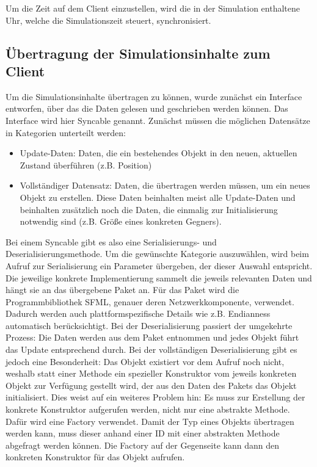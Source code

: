 Um die Zeit auf dem Client einzustellen, wird die in der Simulation enthaltene Uhr, welche die Simulationszeit steuert, synchronisiert.



\subsection{Übertragung der Simulationsinhalte zum Client}
\label{sec:syncable}
Um die Simulationsinhalte übertragen zu können, wurde zunächst ein Interface entworfen, über das die Daten gelesen und geschrieben werden können. Das Interface wird hier Syncable genannt.
Zunächst müssen die möglichen Datensätze in Kategorien unterteilt werden:
\begin{itemize}
\item Update-Daten: Daten, die ein bestehendes Objekt in den neuen, aktuellen Zustand überführen (z.B. Position)
\item Vollständiger Datensatz: Daten, die übertragen werden müssen, um ein neues Objekt zu erstellen. Diese Daten beinhalten meist alle Update-Daten und beinhalten zusätzlich noch die Daten, die einmalig zur Initialisierung notwendig sind (z.B. Größe eines konkreten Gegners).
\end{itemize}
Bei einem Syncable gibt es also eine Serialisierungs- und Deserialisierungsmethode. Um die gewünschte Kategorie auszuwählen, wird beim Aufruf zur Serialisierung ein Parameter übergeben, der dieser Auswahl entspricht. Die jeweilige konkrete Implementierung sammelt die jeweils relevanten Daten und hängt sie an das übergebene Paket an. Für das Paket wird die Programmbibliothek SFML, genauer deren Netzwerkkomponente, verwendet. Dadurch werden auch plattformspezifische Details wie z.B. Endianness automatisch berücksichtigt. Bei der Deserialisierung passiert der umgekehrte Prozess: Die Daten werden aus dem Paket entnommen und jedes Objekt führt das Update entsprechend durch. Bei der vollständigen Deserialisierung gibt es jedoch eine Besonderheit: Das Objekt existiert vor dem Aufruf noch nicht, weshalb statt einer Methode ein spezieller Konstruktor vom jeweils konkreten Objekt zur Verfügung gestellt wird, der aus den Daten des Pakets das Objekt initialisiert.
Dies weist auf ein weiteres Problem hin: Es muss zur Erstellung der konkrete Konstruktor aufgerufen werden, nicht nur eine abstrakte Methode. Dafür wird eine Factory verwendet. Damit der Typ eines Objekts übertragen werden kann, muss dieser anhand einer ID mit einer abstrakten Methode abgefragt werden können. Die Factory auf der Gegenseite kann dann den konkreten Konstruktor für das Objekt aufrufen.
